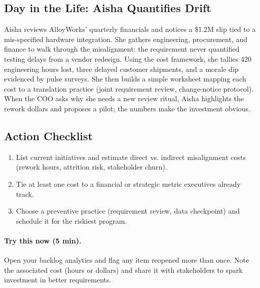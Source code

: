 \subsection{Day in the Life: Aisha Quantifies Drift}
Aisha reviews AlloyWorks' quarterly financials and notices a \$1.2M slip tied to a mis-specified hardware integration. She gathers engineering, procurement, and finance to walk through the misalignment: the requirement never quantified testing delays from a vendor redesign. Using the cost framework, she tallies 420 engineering hours lost, three delayed customer shipments, and a morale dip evidenced by pulse surveys. She then builds a simple worksheet mapping each cost to a translation practice (joint requirement review, change-notice protocol). When the COO asks why she needs a new review ritual, Aisha highlights the rework dollars and proposes a pilot; the numbers make the investment obvious.

\subsection{Action Checklist}
\begin{enumerate}
    \item List current initiatives and estimate direct vs. indirect misalignment costs (rework hours, attrition risk, stakeholder churn).
    \item Tie at least one cost to a financial or strategic metric executives already track.
    \item Choose a preventive practice (requirement review, data checkpoint) and schedule it for the riskiest program.
\end{enumerate}

\paragraph{Try this now (5 min).} Open your backlog analytics and flag any item reopened more than once. Note the associated cost (hours or dollars) and share it with stakeholders to spark investment in better requirements.

